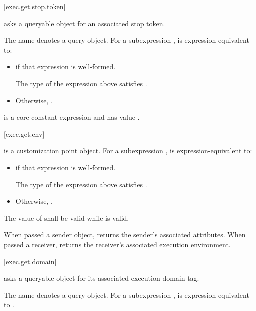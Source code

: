 [exec.get.stop.token]{}

\pnum
{} asks a queryable object for an associated stop token.

\pnum
The name  denotes a query object.
For a subexpression ,
 is expression-equivalent to:
\begin{itemize}
\item
{}
if that expression is well-formed.

\mandates
The type of the expression above satisfies .

\item
Otherwise, .
\end{itemize}

\pnum
{} is a core constant expression and
has value .

[exec.get.env]{}

\pnum
{} is a customization point object.
For a subexpression ,
 is expression-equivalent to:
\begin{itemize}
\item
{}
if that expression is well-formed.

\mandates
The type of the expression above satisfies
.
\item
Otherwise, .
\end{itemize}

\pnum
The value of  shall be valid while  is valid.

\pnum
\begin{note}
When passed a sender object,
 returns the sender's associated attributes.
When passed a receiver,
 returns the receiver's associated execution environment.
\end{note}

[exec.get.domain]{}

\pnum
{} asks a queryable object
for its associated execution domain tag.

\pnum
The name  denotes a query object.
For a subexpression ,
 is expression-equivalent to
.

